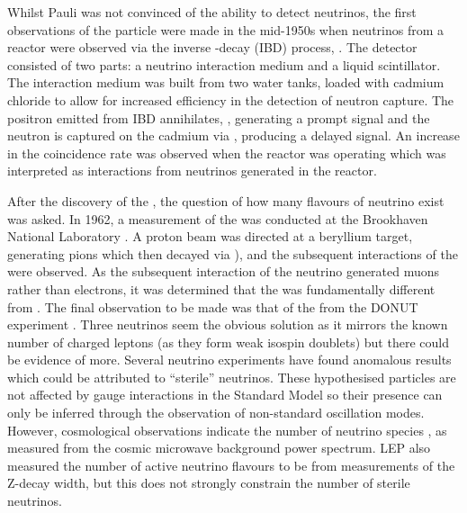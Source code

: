 Whilst Pauli was not convinced of the ability to detect neutrinos, the first observations of the particle were made in the mid-1950s when neutrinos from a reactor were observed via the inverse \quickmath{\beta}-decay (IBD) process,  \cite{reines_cowan_1,reines_cowan_2}.
The detector consisted of two parts: a neutrino interaction medium and a liquid scintillator. The interaction medium was built from two water tanks, loaded with cadmium chloride to allow for increased efficiency in the detection of neutron capture. The positron emitted from IBD annihilates, , generating a prompt signal and the neutron is captured on the cadmium via , producing a delayed signal. An increase in the coincidence rate was observed when the reactor was operating which was interpreted as interactions from neutrinos generated in the reactor.

After the discovery of the , the question of how many flavours of neutrino exist was asked. In 1962, a measurement of the \quickmath{\nu_{\mu}} was conducted at the Brookhaven National Laboratory \cite{Lederman}. A proton beam was directed at a beryllium target, generating pions which then decayed via \quickmath{\pi^{\pm} \rightarrow \mu^{\pm} + (\nu_{\mu}, \bar{\nu}_\mu}), and the subsequent interactions of the \quickmath{\nu_{\mu}} were observed. As the subsequent interaction of the neutrino generated muons rather than electrons, it was determined that the \quickmath{\nu_{\mu}} was fundamentally different from . The final observation to be made was that of the \quickmath{\nu_{\tau}} from the DONUT experiment \cite{tau_nu_disc}. Three neutrinos seem the obvious solution as it mirrors the known number of charged leptons (as they form weak isospin doublets) but there could be evidence of more. Several neutrino experiments have found anomalous results \cite{PhysRevD.64.112007, PhysRevLett.110.161801} which could be attributed to ``sterile'' neutrinos. These hypothesised particles are not affected by gauge interactions in the Standard Model so their presence can only be inferred through the observation of non-standard oscillation modes. However, cosmological observations indicate the number of neutrino species  \cite{Planck2018}, as measured from the cosmic microwave background power spectrum. LEP also measured the number of active neutrino flavours to be  \cite{lep} from measurements of the Z-decay width, but this does not strongly constrain the number of sterile neutrinos.

